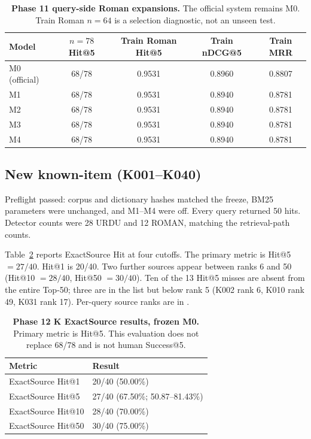 \documentclass[10pt,letterpaper]{article}
\begin{document}
\begin{table}[!ht]
\centering
\caption{\textbf{Phase 11 query-side Roman expansions.} The official system remains M0. Train Roman $n = 64$ is a selection diagnostic, not an unseen test.}
\begin{tabular}{|l|c|c|c|c|}
\hline
\textbf{Model} & \textbf{$n = 78$ Hit@5} & \textbf{Train Roman Hit@5} & \textbf{Train nDCG@5} & \textbf{Train MRR} \\
\hline
M0 (official) & 68/78 & 0.9531 & 0.8960 & 0.8807 \\
\hline
M1 & 68/78 & 0.9531 & 0.8940 & 0.8781 \\
\hline
M2 & 68/78 & 0.9531 & 0.8940 & 0.8781 \\
\hline
M3 & 68/78 & 0.9531 & 0.8940 & 0.8781 \\
\hline
M4 & 68/78 & 0.9531 & 0.8940 & 0.8781 \\
\hline
\end{tabular}
\label{table3}
\end{table}

\subsection*{New known-item (K001--K040)}

Preflight passed: corpus and dictionary hashes matched the freeze, BM25 parameters were unchanged, and M1--M4 were off. Every query returned 50 hits. Detector counts were 28 URDU and 12 ROMAN, matching the retrieval-path counts.

Table~\ref{table4} reports ExactSource Hit at four cutoffs. The primary metric is Hit@5 $= 27/40$. Hit@1 is 20/40. Two further sources appear between ranks 6 and 50 (Hit@10 $= 28/40$, Hit@50 $= 30/40$). Ten of the 13 Hit@5 misses are absent from the entire Top-50; three are in the list but below rank 5 (K002 rank 6, K010 rank 49, K031 rank 17). Per-query source ranks are in .

\begin{table}[!ht]
\centering
\caption{\textbf{Phase 12 K ExactSource results, frozen M0.} Primary metric is Hit@5. This evaluation does not replace 68/78 and is not human Success@5.}
\begin{tabular}{|l|l|}
\hline
\textbf{Metric} & \textbf{Result} \\
\hline
ExactSource Hit@1 & 20/40 (50.00\%) \\
\hline
ExactSource Hit@5 & 27/40 (67.50\%; 50.87--81.43\%) \\
\hline
ExactSource Hit@10 & 28/40 (70.00\%) \\
\hline
ExactSource Hit@50 & 30/40 (75.00\%) \\
\hline
\end{tabular}
\label{table4}
\end{table}
\end{document}
